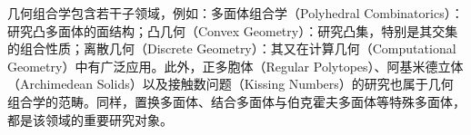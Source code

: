 几何组合学包含若干子领域，例如：多面体组合学（Polyhedral Combinatorics）：研究凸多面体的面结构；凸几何（Convex Geometry）：研究凸集，特别是其交集的组合性质；离散几何（Discrete Geometry）：其又在计算几何（Computational Geometry）中有广泛应用。此外，正多胞体（Regular Polytopes）、阿基米德立体（Archimedean Solids）以及接触数问题（Kissing Numbers）的研究也属于几何组合学的范畴。同样，置换多面体、结合多面体与伯克霍夫多面体等特殊多面体，都是该领域的重要研究对象。








